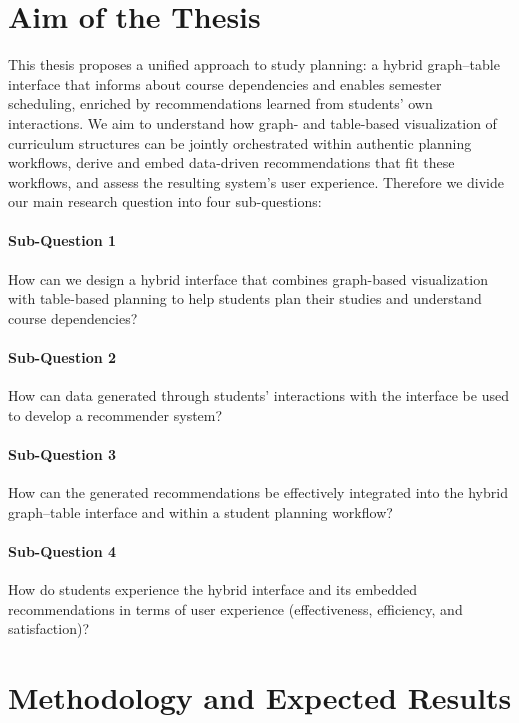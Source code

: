 \documentclass[paper=a4,fontsize=11pt,oneside,titlepage]{scrartcl}
\begin{document}
\section{Aim of the Thesis}
\label{sec:aim}

This thesis proposes a unified approach to study planning: a hybrid graph–table interface that informs about course dependencies and enables semester scheduling, enriched by recommendations learned from students’ own interactions. We aim to understand how graph- and table-based visualization of curriculum structures can be jointly orchestrated within authentic planning workflows, derive and embed data-driven recommendations that fit these workflows, and assess the resulting system’s user experience. Therefore we divide our main research question into four sub-questions:

\paragraph{Sub-Question 1} How can we design a hybrid interface that combines graph-based visualization with table-based planning to help students plan their studies and understand course dependencies?

\paragraph{Sub-Question 2} How can data generated through students’ interactions with the interface be used to develop a recommender system?

\paragraph{Sub-Question 3} How can the generated recommendations be effectively integrated into the hybrid graph–table interface and within a student planning workflow?

\paragraph{Sub-Question 4} How do students experience the hybrid interface and its embedded recommendations in terms of user experience (effectiveness, efficiency, and satisfaction)?

\section{Methodology and Expected Results}
\label{sec:methods}
\end{document}
